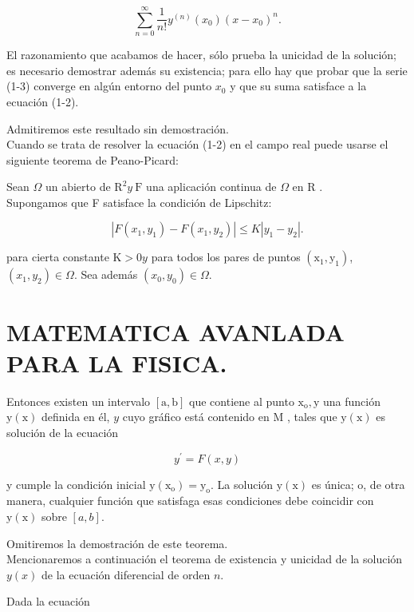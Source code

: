 \documentclass[10pt]{article}
\theoremstyle{plain}
\theoremstyle{definition}
\theoremstyle{remark}
\begin{document}
\begin{equation*}
\sum_{n=0}^{\infty} \frac{1}{n!} y^{(n)}\left(x_{0}\right)\left(x-x_{0}\right)^{n} . \tag{1-3}
\end{equation*}


El razonamiento que acabamos de hacer, sólo prueba la unicidad de la solución; es necesario demostrar además su existencia; para ello hay que probar que la serie (1-3) converge en algún entorno del punto $x_{0}$ y que su suma satisface a la ecuación (1-2).

Admitiremos este resultado sin demostración.\\
Cuando se trata de resolver la ecuación (1-2) en el campo real puede usarse el siguiente teorema de Peano-Picard:

Sean $\Omega$ un abierto de $\mathrm{R}^{2} y \mathrm{~F}$ una aplicación continua de $\Omega$ en R .\\
Supongamos que F satisface la condición de Lipschitz:

$$
\left|F\left(x_{1}, y_{1}\right)-F\left(x_{1}, y_{2}\right)\right| \leqslant K\left|y_{1}-y_{2}\right| .
$$

para cierta constante $\mathrm{K}>0 y$ para todos los pares de puntos $\left(\mathrm{x}_{1}, \mathrm{y}_{1}\right)$, $\left(x_{1}, y_{2}\right) \in \Omega$. Sea además $\left(x_{0}, y_{0}\right) \in \Omega$.

\section*{MATEMATICA AVANLADA PARA LA FISICA.}
Entonces existen un intervalo $[\mathrm{a}, \mathrm{b}]$ que contiene al punto $\mathrm{x}_{\mathrm{o}}, \mathrm{y}$ una función $\mathrm{y}(\mathrm{x})$ definida en él, $y$ cuyo gráfico está contenido en M , tales que $\mathrm{y}(\mathrm{x})$ es solución de la ecuación

$$
y^{\prime}=F(x, y)
$$

y cumple la condición inicial $\mathrm{y}\left(\mathrm{x}_{\mathrm{o}}\right)=\mathrm{y}_{\mathrm{o}}$. La solución $\mathrm{y}(\mathrm{x})$ es única; o, de otra manera, cualquier función que satisfaga esas condiciones debe coincidir con $\mathrm{y}(\mathrm{x})$ sobre $[a, b]$.

Omitiremos la demostración de este teorema.\\
Mencionaremos a continuación el teorema de existencia y unicidad de la solución $y(x)$ de la ecuación diferencial de orden $n$.

Dada la ecuación
\end{document}
